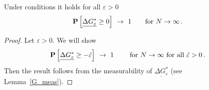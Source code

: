  \begin{lemma}
   \label{bw:cd:lem2}
   Under conditions it holds
   for all $\varepsilon>0$
\begin{gather}
   \P
   \left[ 
     \underline{
     \Delta G^*
     _\varepsilon
     }
     \ge 
     0
   \right]
   \ 
   \to
   \ 
   1
   \qquad
   \text{for}
   \ 
   N\to\infty
   \,.
\end{gather}
 \end{lemma}
 \begin{proof}
   Let $\varepsilon>0$.
   We will show
\begin{gather}
   \P
   \left[ 
     \underline{
     \Delta G^*
     _\varepsilon
     }
     \ge 
     -\tilde{\varepsilon}
   \right]
   \ 
   \to
   \ 
   1
   \qquad
   \ 
   \text{for}
   \ 
   N\to\infty
   \ 
   \text{for all}\ 
   \tilde{\varepsilon}>0
   \,.
\end{gather}
Then the result follows from the measurability of 
$
     \underline{
     \Delta G^*
     _\varepsilon
     }
$
(see Lemma~\ref{G_meas}).
 \end{proof}

